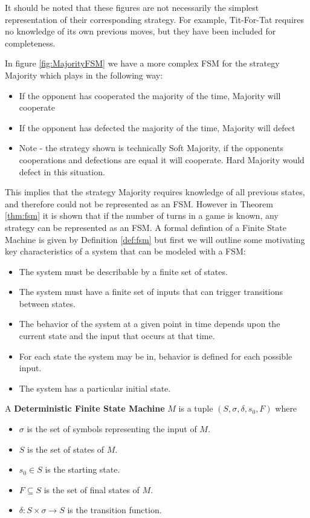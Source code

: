 It should be noted that these figures are not necessarily the simplest representation of their corresponding strategy.
For example, Tit-For-Tat requires no knowledge of its own previous moves, but they have been included for completeness.

In figure \ref{fig:MajorityFSM} we have a more complex FSM for the strategy Majority which plays in the following way:

\begin{itemize}
  \item If the opponent has cooperated the majority of the time, Majority will cooperate
  \item If the opponent has defected the majority of the time, Majority will defect
  \item Note - the strategy shown is technically Soft Majority, if the opponents cooperations and defections are equal it will cooperate. Hard Majority would defect in this situation.
\end{itemize}

This implies that the strategy Majority requires knowledge of all previous states, and therefore could not be represented as an FSM.
However in Theorem \ref{thm:fsm} it is shown that if the number of turns in a game is known, any strategy can be represented as an FSM. A formal defintion of a Finite State Machine is given by Definition \ref{def:fsm} but first we will outline some motivating key characteristics of a system that can be modeled with a FSM:

\begin{itemize}
 \item The system must be describable by a finite set of states.
 \item The system must have a finite set of inputs that can trigger transitions between states.
 \item The behavior of the system at a given point in time depends upon the current state and the input that occurs at that time.
 \item For each state the system may be in, behavior is defined for each possible input.
 \item The system has a particular initial state.
\end{itemize}

\begin{definition}\label{def:fsm}
A \textbf{Deterministic Finite State Machine} $M$ is a tuple $(S, \sigma, \delta, s_0, F)$ where
\begin{itemize}
 \item $\sigma$ is the set of symbols representing the input of $M$.
 \item $S$ is the set of states of $M$.
 \item $s_0 \in S$ is the starting state.
 \item $F \subseteq S$ is the set of final states of $M$.
 \item $\delta: S \times \sigma \rightarrow S$ is the transition function.
\end{itemize}
\end{definition}

